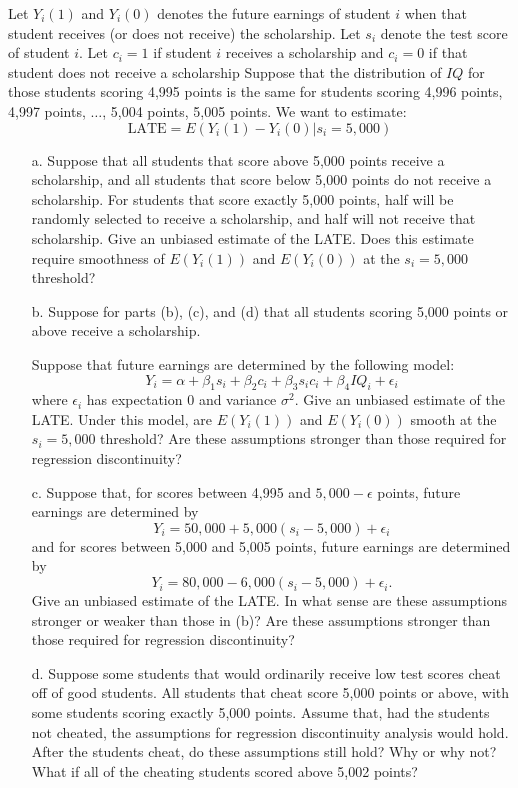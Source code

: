 \documentclass{article}
\begin{document}
\vspace{1em}
\noindent   Let $Y_i(1)$ and $Y_i(0)$ denotes the future earnings of student $i$
   when that student receives (or does not receive) the scholarship.        
   Let $s_i$ denote the test score of student $i$.   
   Let $c_i =1$ if student $i$ receives a scholarship
   and $c_i = 0$ if that student does not receive a scholarship
   Suppose that the distribution of $IQ$ for those students scoring 4,995 points 
   is the same for students scoring 4,996 points, 4,997 points, 
   $\ldots$, 5,004 points, 5,005 points.
   We want to estimate:
   $$
     \text{LATE} = E(Y_i(1) - Y_i(0) | s_i = 5,000)
   $$
   \begin{itemize}
     \item[a.] 
       Suppose that all students that score above 5,000 points receive a scholarship, and
       all students that score below 5,000 points do not receive a scholarship.
       For students that score exactly 5,000 points, half will be randomly selected to receive
       a scholarship, and half will not receive that scholarship.
       Give an unbiased estimate of the LATE.
       Does this estimate require smoothness of $E(Y_i(1))$ and $E(Y_i(0))$ 
       at the $s_i = 5,000$ threshold?
     \item[b.]
       Suppose for parts (b), (c), and (d) that all students scoring 5,000 points or above
       receive a scholarship.
       
       Suppose that future earnings are determined by the following model:
       $$
         Y_i = \alpha + \beta_1 s_i + \beta_2c_i 
                +\beta_3s_ic_i + \beta_4IQ_i + \epsilon_i
       $$
       where $\epsilon_i$ has expectation $0$ and variance $\sigma^2$.
       Give an unbiased estimate of the LATE.
       Under this model, are $E(Y_i(1))$ and $E(Y_i(0))$ smooth at the 
       $s_i = 5,000$ threshold?
       Are these assumptions stronger than those 
       required for regression discontinuity?
     \item[c.]
       Suppose that, for scores between 4,995 and $5,000-\epsilon$ points, 
       future earnings are determined by
       $$
         Y_i = 50,000 + 5,000(s_i - 5,000) + \epsilon_i
       $$
       and for scores between 5,000 and 5,005 points, future earnings are determined by
       $$
         Y_i = 80,000 - 6,000(s_i - 5,000) + \epsilon_i.
       $$
       Give an unbiased estimate of the LATE.
       In what sense are these assumptions stronger or weaker than those in (b)?
       Are these assumptions stronger than those required for regression discontinuity?
     \item[d.]
       Suppose some students that would ordinarily receive low test scores cheat off of good students.
       All students that cheat score 5,000 points or above, 
       with some students scoring exactly 5,000 points.
       Assume that, had the students not cheated, 
       the assumptions for regression discontinuity analysis would hold. 
       After the students cheat, do these assumptions still hold?
       Why or why not?
       What if all of the cheating students scored above 5,002 points?
  \end{itemize}
\end{document}
